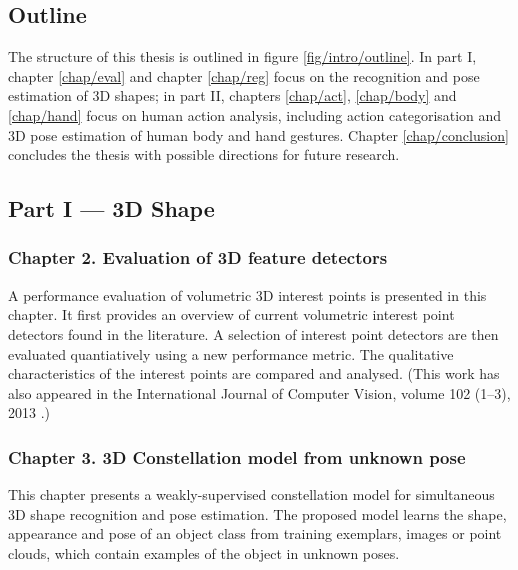 \subsection{Outline}

The structure of this thesis is outlined in figure \ref{fig/intro/outline}. In part I, chapter \ref{chap/eval} and chapter \ref{chap/reg} focus on the recognition and pose estimation of 3D shapes; in part II, chapters \ref{chap/act}, \ref{chap/body} and \ref{chap/hand} focus on human action analysis, including action categorisation and 3D pose estimation of human body and hand gestures. Chapter \ref{chap/conclusion} concludes the thesis with possible directions for future research. 

\subsection*{Part I --- 3D Shape}


\subsubsection*{Chapter 2. Evaluation of 3D feature detectors} 
A performance evaluation of volumetric 3D interest points is presented in this chapter. 
It first provides an overview of current volumetric interest point detectors found in the literature. A selection of interest point detectors are then evaluated quantiatively using a new performance metric. 
The qualitative characteristics of the interest points are compared and analysed.
(This work has also appeared in the International Journal of Computer Vision, volume 102 (1--3), 2013 \cite{Yu2013a}.)  

\subsubsection*{Chapter 3. 3D Constellation model from unknown pose}
This chapter presents a weakly-supervised constellation model for simultaneous 3D shape recognition and pose estimation. 
The proposed model learns the shape, appearance and pose of an object class from training exemplars, \eg images or point clouds, which contain examples of the object in unknown poses.  

